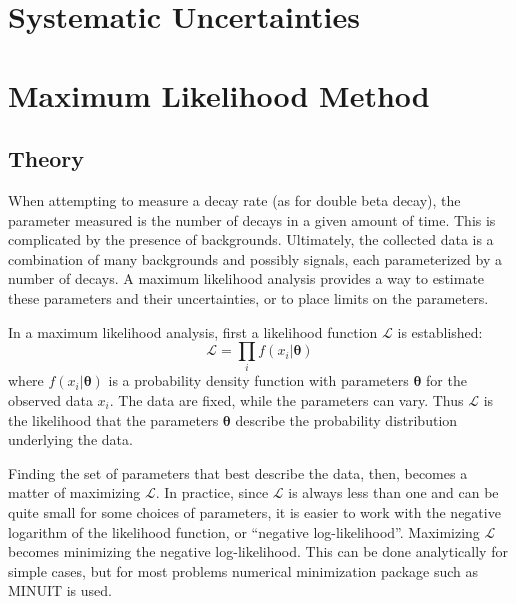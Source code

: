 \documentclass[herrin-thesis.tex]{subfiles}
\begin{document}
\section{Systematic Uncertainties}

\section{Maximum Likelihood Method}
\subsection{Theory}
When attempting to measure a decay rate (as for double beta decay), the parameter measured is the number of decays in a given amount of time. This is complicated by the presence of backgrounds. Ultimately, the collected data is a combination of many backgrounds and possibly signals, each parameterized by a number of decays. A maximum likelihood analysis provides a way to estimate these parameters and their uncertainties, or to place limits on the parameters.

In a maximum likelihood analysis, first a likelihood function \(\mathcal{L}\) is established:
\begin{equation}
\mathcal{L} = \prod_i f(x_i|\boldsymbol{\theta})
\end{equation}
where \(f(x_i|\boldsymbol{\theta})\) is a probability density function with parameters \(\boldsymbol{\theta}\) for the observed data \(x_i\). The data are fixed, while the parameters can vary. Thus \(\mathcal{L}\) is the likelihood that the parameters \(\boldsymbol{\theta}\) describe the probability distribution underlying the data.

Finding the set of parameters that best describe the data, then, becomes a matter of maximizing \(\mathcal{L}\). In practice, since \(\mathcal{L}\) is always less than one and can be quite small for some choices of parameters, it is easier to work with the negative logarithm of the likelihood function, or ``negative log-likelihood''. Maximizing \(\mathcal{L}\) becomes minimizing the negative log-likelihood. This can be done analytically for simple cases, but for most problems numerical minimization package such as MINUIT\cite{James:1975kx} is used.
\end{document}
